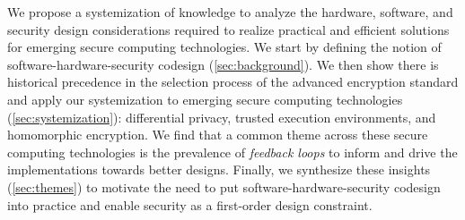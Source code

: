 We propose a systemization of knowledge to analyze the hardware, software, and security design considerations required to realize practical and efficient solutions for emerging secure computing technologies.
We start by defining the notion of software-hardware-security codesign (\autoref{sec:background}).
We then show there is historical precedence in the selection process of the advanced encryption standard and apply our systemization to emerging secure computing technologies (\autoref{sec:systemization}): differential privacy, trusted execution environments, and homomorphic encryption.
We find that a common theme across these secure computing technologies is the prevalence of \textit{feedback loops} to inform and drive the implementations towards better designs.
Finally, we synthesize these insights (\autoref{sec:themes}) to motivate the need to put software-hardware-security codesign into practice and enable security as a first-order design constraint.
